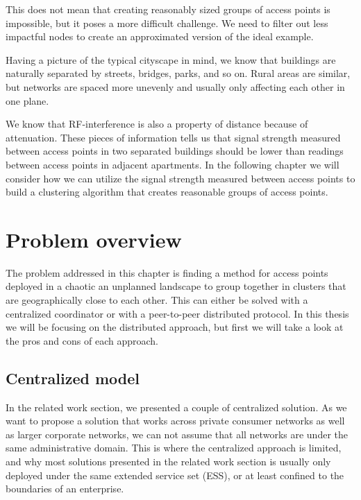 This does not mean that creating reasonably sized groups of access points is impossible, but it poses a more difficult challenge. 
We need to filter out less impactful nodes to create an approximated version of the ideal example.

Having a picture of the typical cityscape in mind, we know that buildings are naturally
separated by streets, bridges, parks, and so on. Rural areas are similar, but networks are spaced more unevenly
and usually only affecting each other in one plane.

We know that RF-interference is also a property of distance because of attenuation.  These pieces of information tells us that signal strength measured
between access points in two separated buildings should be lower than readings between access points in adjacent apartments. In the following chapter we will consider how we can utilize the signal strength measured between access points to build a clustering algorithm that creates reasonable groups of access points. 


\section{Problem overview}
The problem addressed in this chapter is finding a method for access points deployed in a chaotic an unplanned landscape to group together in clusters that are geographically close to each other.
This can either be solved with a centralized coordinator or with a peer-to-peer distributed protocol. In this thesis we will be focusing on the distributed approach, but first we will take a look at the pros and cons of each approach.

\subsection{Centralized model}
In the related work section, we presented a couple of centralized solution. As we want to propose a solution that works across private consumer networks as well as larger corporate networks,
we can not assume that all networks are under the same administrative domain. This is where the centralized approach is limited, and why most solutions presented in the related work section is usually only deployed under the same extended service set (ESS), or at least confined to the boundaries of an enterprise. 

